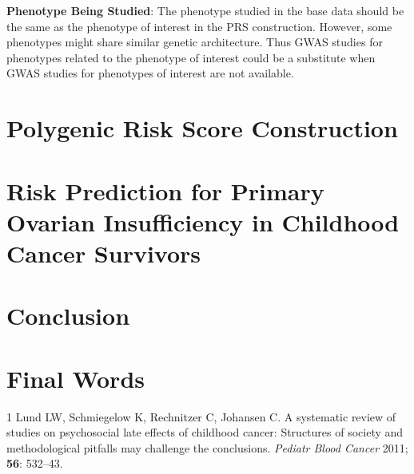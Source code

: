 \documentclass[
]{book}
\begin{document}
\textbf{Phenotype Being Studied}: The phenotype studied in the base data should be the same as the phenotype of interest in the PRS construction. However, some phenotypes might share similar genetic architecture. Thus GWAS studies for phenotypes related to the phenotype of interest could be a substitute when GWAS studies for phenotypes of interest are not available.

\hypertarget{polygenic-risk-score-construction}{%
\chapter{Polygenic Risk Score Construction}\label{polygenic-risk-score-construction}}

\hypertarget{risk-prediction-for-primary-ovarian-insufficiency-in-childhood-cancer-survivors}{%
\chapter{Risk Prediction for Primary Ovarian Insufficiency in Childhood Cancer Survivors}\label{risk-prediction-for-primary-ovarian-insufficiency-in-childhood-cancer-survivors}}

\hypertarget{conclusion}{%
\chapter{Conclusion}\label{conclusion}}

\hypertarget{final-words}{%
\chapter{Final Words}\label{final-words}}

\hypertarget{refs}{}
\leavevmode\hypertarget{ref-lund2011}{}%
1 Lund LW, Schmiegelow K, Rechnitzer C, Johansen C. A systematic review of studies on psychosocial late effects of childhood cancer: Structures of society and methodological pitfalls may challenge the conclusions. \emph{Pediatr Blood Cancer} 2011; \textbf{56}: 532--43.
\end{document}
